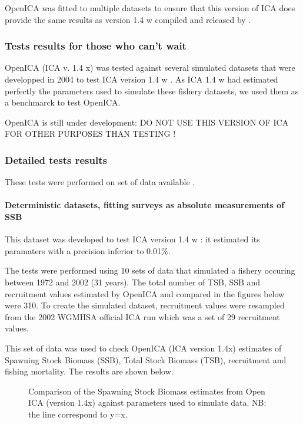 OpenICA was fitted to multiple datasets to ensure that this version of ICA does provide the same results as version 1.4 w compiled and released by \cite{pat96a}.

\subsubsection{Tests results for those who can't wait}

OpenICA (ICA v. 1.4 x) was tested against several simulated datasets that were developped in 2004 to test ICA version 1.4 w \citep{kieTR05}. As ICA 1.4 w had estimated perfectly the parameters used to simulate these fishery datasets, we used them as a benchmarck to test OpenICA.

OpenICA is still under development: DO NOT USE THIS VERSION OF ICA FOR OTHER PURPOSES THAN TESTING !

\subsubsection{Detailed tests results}

These tests were performed on set of data available .

\paragraph{Deterministic datasets, fitting surveys as absolute measurements of SSB}

This dataset was developed to test ICA version 1.4 w \citep{kieTR05}: it estimated its paramaters with a precision inferior to 0.01\%. 

The tests were performed using 10 sets of data that simulated a fishery occuring between 1972 and 2002 (31 years). The total number of TSB, SSB and recruitment values estimated by OpenICA and compared in the figures below were 310. To create the simulated dataset, recruitment values were resampled from the 2002 WGMHSA official ICA run which was a set of 29 recruitment values.

This set of data was used to check OpenICA (ICA version 1.4x) estimates of Spawning Stock Biomass (SSB), Total Stock Biomass (TSB), recruitment and fishing mortality. The results are shown below.

\begin{figure}
	\begin{center}
	\end{center}
	\caption{Comparison of the Spawning Stock Biomass estimates from Open ICA (version 1.4x) against parameters used to simulate data. NB: the line correspond to y=x.}
\end{figure}

